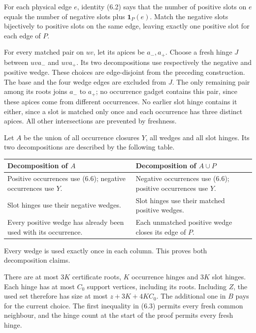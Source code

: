 \documentclass[english,11pt,a4paper]{article}
\begin{document}
For each physical edge \(e\), identity (6.2) says that the number of positive slots on \(e\) equals the number of negative slots plus \(\mathbf1_P(e)\). Match the negative slots bijectively to positive slots on the same edge, leaving exactly one positive slot for each edge of \(P\).

For every matched pair on \(uv\), let its apices be \(a_-,a_+\). Choose a fresh hinge \(J\) between \(uva_-\) and \(uva_+\). Its two decompositions use respectively the negative and positive wedge. These choices are edge-disjoint from the preceding construction. The base and the four wedge edges are excluded from \(J\). The only remaining pair among its roots joins \(a_-\) to \(a_+\); no occurrence gadget contains this pair, since these apices come from different occurrences. No earlier slot hinge contains it either, since a slot is matched only once and each occurrence has three distinct apices. All other intersections are prevented by freshness.

Let \(A\) be the union of all occurrence closures \(Y\), all wedges and all slot hinges. Its two decompositions are described by the following table.

{\begin{longtable}[]{@{}
  >{\raggedright\arraybackslash}p{}
  >{\raggedright\arraybackslash}p{}@{}}
\toprule\noalign{}
\begin{minipage}[b]{\linewidth}\raggedright
Decomposition of \(A\)
\end{minipage} & \begin{minipage}[b]{\linewidth}\raggedright
Decomposition of \(A\cup P\)
\end{minipage} \\
\midrule\noalign{}
\endhead
\bottomrule\noalign{}
\endlastfoot
Positive occurrences use (6.6); negative occurrences use \(Y\). & Negative occurrences use (6.6); positive occurrences use \(Y\). \\
Slot hinges use their negative wedges. & Slot hinges use their matched positive wedges. \\
Every positive wedge has already been used with its occurrence. & Each unmatched positive wedge closes its edge of \(P\). \\
\end{longtable}
}

Every wedge is used exactly once in each column. This proves both decomposition claims.

There are at most \(3K\) certificate roots, \(K\) occurrence hinges and \(3K\) slot hinges. Each hinge has at most \(C_0\) support vertices, including its roots. Including \(Z\), the used set therefore has size at most \(z+3K+4KC_0\). The additional one in \(B\) pays for the current choice. The first inequality in (6.3) permits every fresh common neighbour, and the hinge count at the start of the proof permits every fresh hinge.
\end{document}
